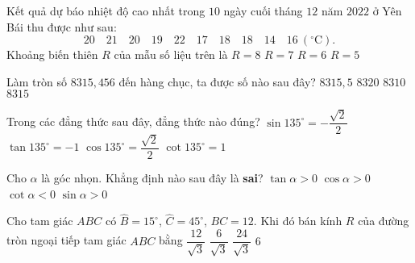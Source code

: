 \begin{ex}%
Kết quả dự báo nhiệt độ cao nhất trong $10$ ngày cuối tháng $12$ năm $2022$ ở Yên Bái thu được như sau:
\[20\quad 21\quad 20\quad 19\quad 22\quad 17\quad 18\quad 18\quad 14\quad 16\ \left(^\circ \mathrm{C}\right). \]
Khoảng biến thiên $R$ của mẫu số liệu trên là
\choice
{\True $R=8$}
{$R=7$}
{$R=6$}
{$R=5$}
\end{ex}

\begin{ex}%
Làm tròn số $8315{,}456$ đến hàng chục, ta được số nào sau đây?
\choice
{$8315{,}5$}
{\True $8320$}
{$8310$}
{$8315$}
\loigiai{

}
\end{ex}

\begin{ex}%
Trong các đẳng thức sau đây, đẳng thức nào đúng?
\choice
{$\sin 135^\circ=-\dfrac{\sqrt{2}}{2}$}
{\True $\tan 135^\circ=-1$}
{$\cos 135^\circ=\dfrac{\sqrt{2}}{2}$}
{$\cot 135^\circ=1$}
\end{ex}

\begin{ex}%
Cho $\alpha$ là góc nhọn. Khẳng định nào sau đây là \textbf{sai}?
\choice
{$\tan \alpha>0$}
{$\cos\alpha>0$}
{\True $\cot \alpha<0$}
{$\sin \alpha>0$}
\loigiai{

}
\end{ex}

\begin{ex}%
Cho tam giác $ABC$ có $\widehat{B}=15^\circ$, $\widehat{C}=45^\circ$, $BC=12$. Khi đó bán kính $R$ của đường tròn ngoại tiếp tam giác $ABC$ bằng
\choice
{\True $\dfrac{12}{\sqrt{3}}$}
{$\dfrac{6}{\sqrt{3}}$}
{$\dfrac{24}{\sqrt{3}}$}
{$6$}
\end{ex}

